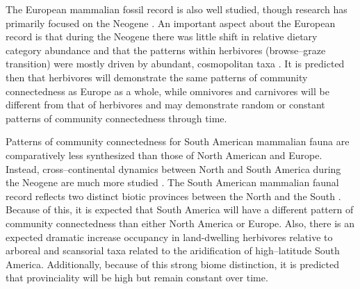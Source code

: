 \documentclass[12pt,letterpaper]{article}
\begin{document}
The European mammalian fossil record is also well studied, though research has primarily focused on the Neogene \citep{Jernvall2002,Jernvall2004,Liow2008,Raia2006,Raia2005,Raia2011c}. An important aspect about the European record is that during the Neogene there was little shift in relative dietary category abundance \citep{Jernvall2004} and that the patterns within herbivores (browse--graze transition) were mostly driven by abundant, cosmopolitan taxa \citep{Jernvall2002}. It is predicted then that herbivores will demonstrate the same patterns of community connectedness as Europe as a whole, while omnivores and carnivores will be different from that of herbivores and may demonstrate random or constant patterns of community connectedness through time. 

Patterns of community connectedness for South American mammalian fauna are comparatively less synthesized than those of North American and Europe. Instead, cross--continental dynamics between North and South America during the Neogene are much more studied \citep{Marshall1982}. The South American mammalian faunal record reflects two distinct biotic provinces between the North and the South \citep{Macfadden1997,Macfadden2006,Flynn1998a,Patterson1968}. Because of this, it is expected that South America will have a different pattern of community connectedness than either North America or Europe. Also, there is an expected dramatic increase occupancy in land-dwelling herbivores relative to arboreal and scansorial taxa related to the aridification of high--latitude South America. Additionally, because of this strong biome distinction, it is predicted that provinciality will be high but remain constant over time. %
\end{document}
